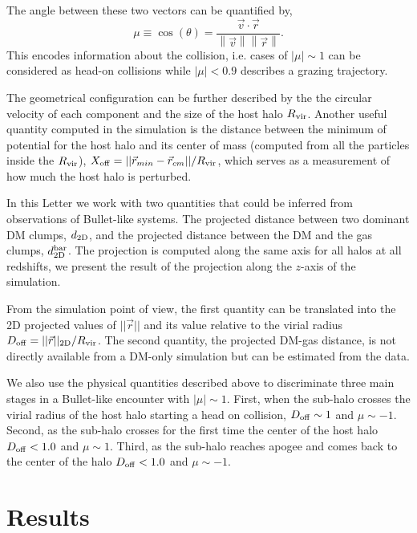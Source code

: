 \documentclass{emulateapj}
\begin{document}
The angle between these two vectors can be quantified by, 
\begin{equation}
  \mu\equiv
  \cos(\theta)=\frac{\vec{v{}}\cdotp{}\vec{r}}{\left\|\vec{v}{}\right\|
    \left\|\vec{r}\right\|} .
 \end{equation} 
%
This encodes information about the collision, i.e. cases of
$|\mu|\sim 1$ can be considered as head-on collisions while
$|\mu|< 0.9$ describes a grazing trajectory.  

The geometrical configuration can be further described by the
the circular velocity of each component and the
size of the host halo $R_{\rm vir}$. Another useful quantity computed
in the simulation is the distance between the minimum of potential for
the host halo and its center of mass (computed from all the particles
inside the $R_{\rm vir}$), $X_{\rm
  off}=||\vec{r}_{min}-\vec{r}_{cm}||/R_{\rm vir}$, which serves as a
measurement of how much the host halo is perturbed.  

In this Letter we work with two quantities that could be inferred
from observations of Bullet-like systems. The projected distance
between two dominant DM clumps, $d_{\rm 2D}$, and the projected distance
between the DM and the gas clumps, $d_{\rm 2D}^{\rm bar}$. The
projection is computed along the same axis for all halos at all
redshifts, we present the result of the projection along the $z$-axis
of the simulation. 

From the simulation point of view, the first quantity can be
translated into the 2D projected values of $||\vec{r}||$ and its value
relative to the virial radius $D_{\rm   off}= ||\vec{r}||_{\rm
  2D}/R_{\rm vir}$. The second quantity, the projected DM-gas
distance, is not directly available from a DM-only simulation but can
be estimated from the data.  

We also use the physical quantities described above to discriminate
three main stages in a Bullet-like encounter with $|\mu|\sim
1$. First, when the sub-halo crosses the virial radius of the host
halo starting a head on collision, $D_{\rm   off} \sim 1$ and $\mu\sim
-1$. Second, as the sub-halo crosses for the first time the center of
the host halo $D_{\rm off}<1.0$ and $\mu\sim 1$. Third, as the
sub-halo reaches apogee and comes back to the center of the halo
$D_{\rm off} < 1.0$ and $\mu\sim -1$.   


\section{Results}
\label{sec:results}
\end{document}
